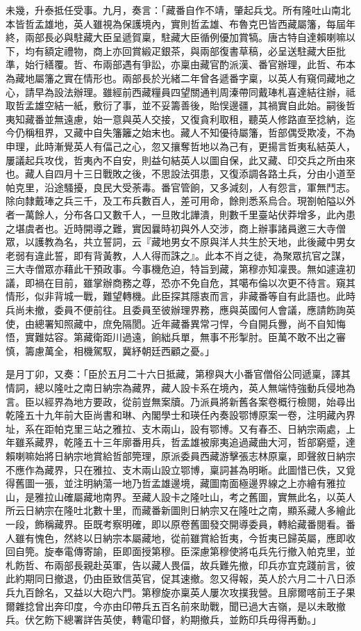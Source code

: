 \begin{pinyinscope}
未幾，升泰抵任受事。九月，奏言：「藏番自作不靖，肇起兵戈。所有隆吐山南北本皆哲孟雄地，英人雖視為保護境內，實則哲孟雄、布魯克巴皆西藏屬籓，每屆年終，兩部長必與駐藏大臣呈遞賀稟，駐藏大臣循例優加賞犒。唐古特自達賴喇嘛以下，均有額定禮物，商上亦回賞緞疋銀茶，與兩部復書草稿，必呈送駐藏大臣批準，始行繕覆。哲、布兩部遇有爭訟，亦稟由藏官酌派漢、番官辦理，此哲、布本為藏地屬籓之實在情形也。兩部長於光緒二年曾各遞番字稟，以英人有窺伺藏地之心，請早為設法辦理。雖經前西藏糧員四望關通判周溱帶同戴琫札喜達結往辦，祗取哲孟雄空結一紙，敷衍了事，並不妥籌善後，貽悮邊疆，其禍實自此始。嗣後哲夷知藏番並無遠慮，始一意與英人交接，又復貪利取租，聽英人修路直至捻納，迄今仍稱租界，又藏中自失籓籬之始末也。藏人不知優待屬籓，哲部偶受欺凌，不為申理，此時漸覺英人有偪己之心，忽又攘奪哲地以為己有，更揚言哲夷私結英人，屢議起兵攻伐，哲夷內不自安，則益句結英人以圖自保，此又藏、印交兵之所由來也。藏人自四月十三日戰敗之後，不思設法弭患，又復添調各路土兵，分由小道至帕克里，沿途騷擾，良民大受荼毒。番官管餉，又多減刻，人有怨言，軍無鬥志。除向隸戴琫之兵三千，及工布兵數百人，差可用命，餘則悉系烏合。現劄帕隘以外者一萬餘人，分布各口又數千人，一旦敗北譁潰，則數千里臺站伏莽增多，此內患之堪虞者也。近時開導之難，實因曩時初與外人交涉，商上辦事諸員邀三大寺僧眾，以護教為名，共立誓詞，云『藏地男女不原與洋人共生於天地，此後藏中男女老弱有違此誓，即有背黃教，人人得而誅之』。此本不肖之徒，為聚眾抗官之謀，三大寺僧眾亦藉此干預政事。今事機危迫，特旨到藏，第穆亦知凜畏。無如遽違初議，即禍在目前，雖掌辦商務之尊，恐亦不免自危，其噶布倫以次更不待言。窺其情形，似非背城一戰，難望轉機。此臣探其隱衷而言，非藏番等自有此語也。此時兵尚未撤，委員不便前往。且委員至彼辦理界務，應與英國何人會議，應請飭詢英使，由總署知照藏中，庶免隔閡。近年藏番異常刁悍，今自開兵釁，尚不自知悔悟，實難姑容。第藏衛距川過遠，餉絀兵單，無事不形掣肘。臣萬不敢不出之審慎，籌慮萬全，相機駕馭，冀紓朝廷西顧之憂。」

是月丁卯，又奏：「臣於五月二十六日抵藏，第穆與大小番官僧俗公同遞稟，譯其情詞，總以隆吐之南日納宗為藏界，藏人設卡系在境內，英人無端恃強動兵侵地為言。臣以經界為地方要政，從前豈無案牘。乃派員將新舊各案卷概行檢閱，始尋出乾隆五十九年前大臣尚書和琳、內閣學士和瑛任內奏設鄂博原案一卷，注明藏內界址，系在距帕克里三站之雅拉、支木兩山，設有鄂博。又有春丕、日納宗兩處，上年雖系藏界，乾隆五十三年廓番用兵，哲孟雄被廓夷追過藏曲大河，哲部窮蹙，達賴喇嘛始將日納宗地賞給哲部筦理，原派委員西藏游擊張志林原稟，即聲敘日納宗不應作為藏界，只在雅拉、支木兩山設立鄂博，稟詞甚為明晰。此圖惜已佚，又覓得舊圖一張，並注明納蕩一地乃哲孟雄邊境，藏圖南面極邊界線之上亦繪有雅拉山，是雅拉山確屬藏地南界。至藏人設卡之隆吐山，考之舊圖，實無此名，以英人所云日納宗在隆吐北數十里，而藏番新圖則日納宗又在隆吐之南，顯系藏人多繪此一段，飾稱藏界。臣既考察明確，即以原卷舊圖發交開導委員，轉給藏番閱看。番人雖有愧色，然終以日納宗本屬藏地，從前雖賞給哲夷，今哲夷已歸英屬，應即收回自筦。旋奉電傳寄諭，臣即面授第穆。臣深慮第穆使將屯兵先行撤入帕克里，並札飭哲、布兩部長親赴英軍，告以藏人畏偪，故兵難先撤，印兵亦宜克踐前言，彼此約期同日撤退，仍由臣致信英官，促其速撤。忽又得報，英人於六月二十八日添兵九百餘名，又益以大砲六門。第穆旋亦稟英人屢次攻撲我營。且廓爾喀前王子果爾雜捻曾出奔印度，今亦由印帶兵五百名前來助戰，聞已過大吉嶺，是以未敢撤兵。伏乞飭下總署詳告英使，轉電印督，約期撤兵，並飭印兵毋得再動。」


\end{pinyinscope}
